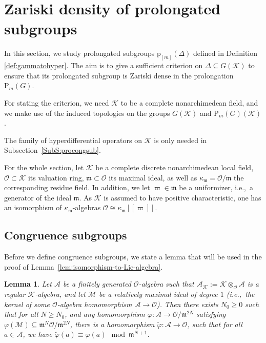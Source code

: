 \documentclass[10pt,a4paper]{amsart}
\theoremstyle{plain} %
\newtheorem{Lemma}[Theorem]{Lemma}
\theoremstyle{definition}
\theoremstyle{remark}
\newcommand{\cA}{\mathcal{A}}
\newcommand{\cM}{\mathcal{M}}
\newcommand{\cK}{\mathcal{K}}   %
\newcommand{\cO}{\mathcal{O}}   %
\newcommand{\ck}{\kappa_\fm}        %
\newcommand{\fm}{\mathfrak{m}}  %
\newcommand{\rP}[1]{\mathrm{P}_{\!#1}}
\newcommand{\ps}[1]{[\![#1]\!]}  %
\newcommand{\prol}[1]{\mathrm{p}_{[#1]}}
\numberwithin{equation}{subsection}
\begin{document}
\section{Zariski density of prolongated subgroups}\label{S:Zdensity}

In this section, we study prolongated subgroups $\prol{m}(\Delta)$ defined in Definition \ref{def:gammatohyper}. The aim is to give a sufficient criterion on $\Delta\subseteq G(\cK)$ to ensure that its prolongated subgroup is Zariski dense in the prolongation $\rP{m}(G)$.

For stating the criterion, we need $\cK$ to be a complete nonarchimedean field, and we make use of the induced topologies on the groups $G(\cK)$ and $\rP{m}(G)(\cK)$.

The family of hyperdifferential operators on $\cK$ is only needed in Subsection~\ref{SubS:procongsub}. 

For the whole section, let $\cK$ be a complete discrete nonarchimedean local field, $\cO\subset \cK$ its valuation ring, $\fm\subset \cO$ its maximal ideal, as well as $\ck=\cO/\fm$ the corresponding residue field. In addition, we let $\varpi\in \fm$ be a uniformizer, i.e.,~a generator of the ideal $\fm$. As $\cK$ is assumed to have positive characteristic, one has an isomorphism of $\ck$-algebras $\cO\cong \ck\ps{\varpi}$.


\subsection{Congruence subgroups}\label{SubS:congruenceSubgroups}

Before we define congruence subgroups, we state a lemma that will be used in the proof of Lemma~\ref{lem:isomorphism-to-Lie-algebra}.

\begin{Lemma}\label{lem:lifting-of-homomorphisms}
    Let $\cA$ be a finitely generated $\cO$-algebra such that $\cA_\cK:=\cK\otimes_\cO \cA$ is a regular $\cK$-algebra, and let $\cM$ be a relatively maximal ideal of degree $1$ (i.e.,~the kernel of some $\cO$-algebra homomorphism $\cA\to \cO$).
    Then there exists $N_0\geq 0$ such that for all $N\geq N_0$, and any homomorphism $\varphi: \cA\to \cO/\fm^{2N}$ satisfying $\varphi(\cM)\subseteq \fm^N\cO/\fm^{2N}$, there is a homomorphism $\tilde{\varphi}:\cA\to \cO$, such that for all $a\in \cA$, we have $\tilde{\varphi}(a) \equiv \varphi(a)\mod \fm^{N+1} $.    
\end{Lemma}
\end{document}
